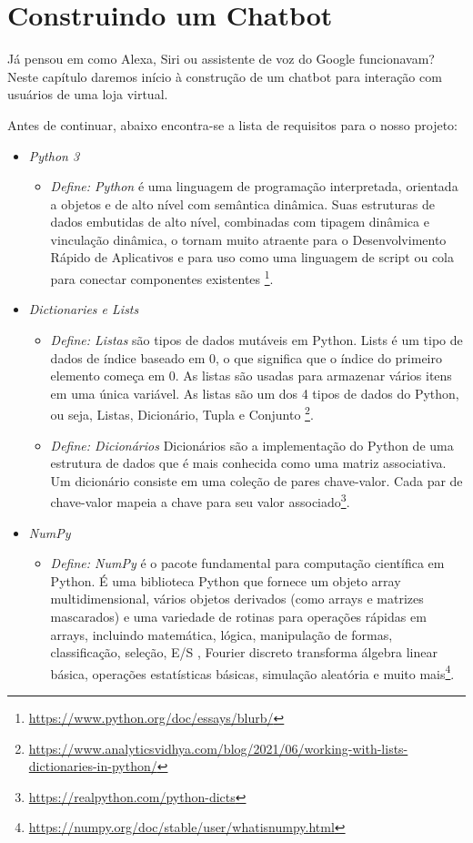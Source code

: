 \chapter[Construindo um Chatbot]{Construindo um Chatbot}

Já pensou em como Alexa, Siri ou assistente de voz do Google funcionavam? Neste capítulo daremos início à construção de um chatbot para interação com usuários de uma loja virtual.

Antes de continuar, abaixo encontra-se a lista de requisitos para o nosso projeto:
\justifying
\begin{itemize}
   \item \textit{Python 3}
         \begin{itemize}
            \item \textit{Define: Python} é uma linguagem de programação interpretada, orientada a objetos e de alto nível com semântica dinâmica. Suas estruturas de dados embutidas de alto nível, combinadas com tipagem dinâmica e vinculação dinâmica, o tornam muito atraente para o Desenvolvimento Rápido de Aplicativos e para uso como uma linguagem de script ou cola para conectar componentes existentes \footnote{\url{https://www.python.org/doc/essays/blurb/}}.
         \end{itemize}

   \item \textit{Dictionaries e Lists}
         \begin{itemize}
            \item \textit{Define: Listas} são tipos de dados mutáveis em Python. Lists é um tipo de dados de índice baseado em 0, o que significa que o índice do primeiro elemento começa em 0. As listas são usadas para armazenar vários itens em uma única variável. As listas são um dos 4 tipos de dados do Python, ou seja, Listas, Dicionário, Tupla e Conjunto \footnote{\url{https://www.analyticsvidhya.com/blog/2021/06/working-with-lists-dictionaries-in-python/}}.
            \item \textit{Define: Dicionários} Dicionários são a implementação do Python de uma estrutura de dados que é mais conhecida como uma matriz associativa. Um dicionário consiste em uma coleção de pares chave-valor. Cada par de chave-valor mapeia a chave para seu valor associado\footnote{\url{https://realpython.com/python-dicts}}.
         \end{itemize}

   \item \textit{NumPy}
         \begin{itemize}
            \item \textit{Define: NumPy} é o pacote fundamental para computação científica em Python. É uma biblioteca Python que fornece um objeto array multidimensional, vários objetos derivados (como arrays e matrizes mascarados) e uma variedade de rotinas para operações rápidas em arrays, incluindo matemática, lógica, manipulação de formas, classificação, seleção, E/S , Fourier discreto transforma álgebra linear básica, operações estatísticas básicas, simulação aleatória e muito mais\footnote{\url{https://numpy.org/doc/stable/user/whatisnumpy.html}}.
         \end{itemize}


\end{itemize}
